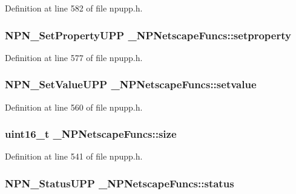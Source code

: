 Definition at line 582 of file npupp.h.

\hypertarget{struct___n_p_netscape_funcs_a9dda4f053e35c4eaef4576901d7ffef8}{
\subsubsection[{setproperty}]{\setlength{\rightskip}{0pt plus 5cm}NPN\_\-SetPropertyUPP {\bf \_\-NPNetscapeFuncs::setproperty}}}
\label{struct___n_p_netscape_funcs_a9dda4f053e35c4eaef4576901d7ffef8}


Definition at line 577 of file npupp.h.

\hypertarget{struct___n_p_netscape_funcs_a95308df023af6ede425bd220371d2b50}{
\subsubsection[{setvalue}]{\setlength{\rightskip}{0pt plus 5cm}NPN\_\-SetValueUPP {\bf \_\-NPNetscapeFuncs::setvalue}}}
\label{struct___n_p_netscape_funcs_a95308df023af6ede425bd220371d2b50}


Definition at line 560 of file npupp.h.

\hypertarget{struct___n_p_netscape_funcs_ae42a298a051cff335a2fef0f1ffd1fdb}{
\subsubsection[{size}]{\setlength{\rightskip}{0pt plus 5cm}uint16\_\-t {\bf \_\-NPNetscapeFuncs::size}}}
\label{struct___n_p_netscape_funcs_ae42a298a051cff335a2fef0f1ffd1fdb}


Definition at line 541 of file npupp.h.

\hypertarget{struct___n_p_netscape_funcs_a8cbd5081e68ebbbfada3a825f0383645}{
\subsubsection[{status}]{\setlength{\rightskip}{0pt plus 5cm}NPN\_\-StatusUPP {\bf \_\-NPNetscapeFuncs::status}}}
\label{struct___n_p_netscape_funcs_a8cbd5081e68ebbbfada3a825f0383645}



